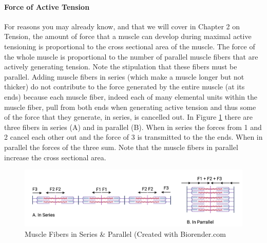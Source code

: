 \paragraph{Force of Active Tension}

For reasons you may already know, and that we will cover in Chapter 2 on Tension, the amount of force that a muscle can develop during maximal active tensioning is proportional to the cross sectional area of the muscle. The force of the whole muscle is proportional to the number of parallel muscle fibers that are actively generating tension. Note the stipulation that these fibers must be parallel. Adding muscle fibers in series (which make a muscle longer but not thicker) do not contribute to the force generated by the entire muscle (at its ends) because each muscle fiber, indeed each of many elemental units within the muscle fiber, pull from both ends when generating active tension and thus some of the force that they generate, in series, is cancelled out. In Figure \ref{fig:Sacromeres_series_parrallel} there are three fibers in series (A) and in parallel (B). When in series the forces from 1 and 2 cancel each other out and the force of 3 is transmitted to the the ends. When in parallel the forces of the three sum. Note that the muscle fibers in parallel increase the cross sectional area.

\begin{figure}[!ht]
    \centering
    \includegraphics[width=1\linewidth]{./figure/Sarcomeres_series_parrallel.png}
    \caption{Muscle Fibers in Series \& Parallel \footnotesize{(Created with Biorender.com}}
    \label{fig:Sacromeres_series_parrallel}
\end{figure}


